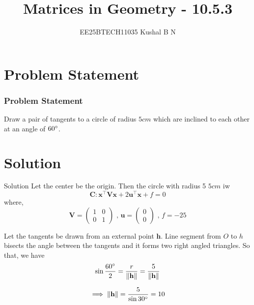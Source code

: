 \documentclass{beamer}
\title{Matrices in Geometry - 10.5.3}
\author{EE25BTECH11035 Kushal B N}
\date{}
\let\vec\mathbf
\theoremstyle{remark}
\providecommand{\norm}[1]{\lVert#1\rVert}
\newcommand{\myvec}[1]{\ensuremath{\begin{pmatrix}#1\end{pmatrix}}}
\begin{document}
\maketitle

\section{Problem Statement}
\begin{frame}
\frametitle{Problem Statement}
Draw a pair of tangents to a circle of radius $5cm$ which are inclined to each other at an angle of $60\degree$.
\end{frame}

\section{Solution}
\begin{frame}{Solution}
Let the center be the origin. Then the circle with radius 5 $5cm$ iw
\begin{equation}
    \vec{C} : \vec{x}^{\top}\vec{V}\vec{x} + 2\vec{u}^{\top}\vec{x} + f = 0
\end{equation}
where,
\begin{equation}
    \vec{V} = \myvec{1&0\\0&1} \text{ , } \vec{u} = \myvec{0\\0} \text{ , } f = -25
\end{equation}

Let the tangents be drawn from an external point $\vec{h}$.
Line segment from $O$ to $h$ bisects the angle between the tangents and it forms two right angled triangles.
So that, we have
\begin{equation}
    \sin{\frac{60 \degree}{2}} = \frac{r}{\norm{\vec{h}}} = \frac{5}{\norm{\vec{h}}}
\end{equation}

\begin{equation}
    \implies \norm{\vec{h}} = \frac{5}{\sin{30 \degree}} = 10
\end{equation}
\end{frame}
\end{document}
